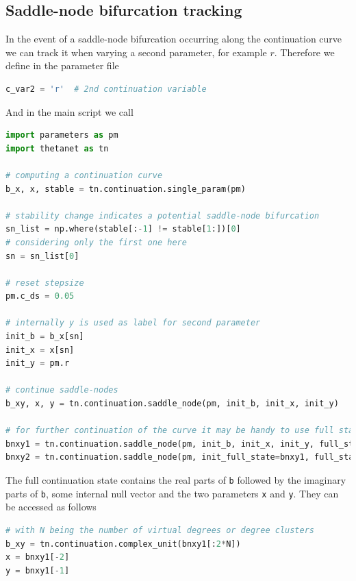 \documentclass[bibliography=totoc, twoside]{article}
\numberwithin{equation}{section}
\begin{document}
\subsection{Saddle-node bifurcation tracking}
In the event of a saddle-node bifurcation occurring along the continuation curve we can track it when varying a second parameter, for example $r$.
Therefore we define in the parameter file
\begin{lstlisting}[language=python]
c_var2 = 'r'  # 2nd continuation variable
\end{lstlisting}
And in the main script we call
\begin{lstlisting}[language=python]
import parameters as pm
import thetanet as tn

# computing a continuation curve
b_x, x, stable = tn.continuation.single_param(pm)

# stability change indicates a potential saddle-node bifurcation
sn_list = np.where(stable[:-1] != stable[1:])[0]
# considering only the first one here
sn = sn_list[0]

# reset stepsize
pm.c_ds = 0.05

# internally y is used as label for second parameter
init_b = b_x[sn]
init_x = x[sn]
init_y = pm.r

# continue saddle-nodes
b_xy, x, y = tn.continuation.saddle_node(pm, init_b, init_x, init_y)

# for further continuation of the curve it may be handy to use full states including the null vector
bnxy1 = tn.continuation.saddle_node(pm, init_b, init_x, init_y, full_state_output=True)
bnxy2 = tn.continuation.saddle_node(pm, init_full_state=bnxy1, full_state_output=True)
\end{lstlisting}
The full continuation state contains the real parts of \texttt{b} followed by the imaginary parts of \texttt{b}, some internal null vector and the two parameters \texttt{x} and \texttt{y}.
They can be accessed as follows
\begin{lstlisting}[language=python]
# with N being the number of virtual degrees or degree clusters
b_xy = tn.continuation.complex_unit(bnxy1[:2*N])
x = bnxy1[-2]
y = bnxy1[-1]
\end{lstlisting}
\end{document}
